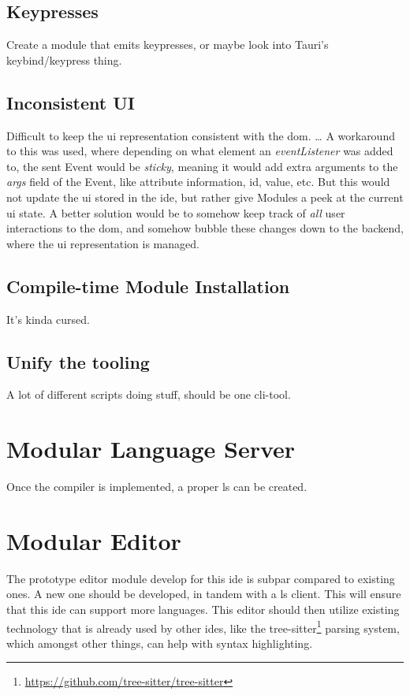 \subsection{Keypresses}

Create a module that emits keypresses, or maybe look into Tauri's
keybind/keypress thing.

\subsection{Inconsistent UI}

Difficult to keep the \gls{ui} representation consistent with the \gls{dom}.
\dots
A workaround to this was used, where depending on what element an
\textit{eventListener} was added to, the sent Event would be \textit{sticky},
meaning it would add extra arguments to the \textit{args} field of the Event,
like attribute information, id, value, etc. But this would not update the
\gls{ui} stored in the \gls{ide}, but rather give Modules a peek at the current
\gls{ui} state. A better solution would be to somehow keep track of \textit{all}
user interactions to the \gls{dom}, and somehow bubble these changes down to the
backend, where the \gls{ui} representation is managed.

\subsection{Compile-time Module Installation}

It's kinda cursed.

\subsection{Unify the tooling}

A lot of different scripts doing stuff, should be one \gls{cli}-tool.

\section{Modular Language Server}

Once the compiler \cite{wiig} is implemented, a proper \gls{ls} can be created.

\section{Modular Editor}

The prototype editor module develop for this \gls{ide} is subpar compared to
existing ones. A new one should be developed, in tandem with a \gls{ls} client.
This will ensure that this \gls{ide} can support more languages. This editor
should then utilize existing technology that is already used by other
\gls{ide}s, like the tree-sitter\footnote{\url{https://github.com/tree-sitter/tree-sitter}}
parsing system, which amongst other things, can help with syntax highlighting.
